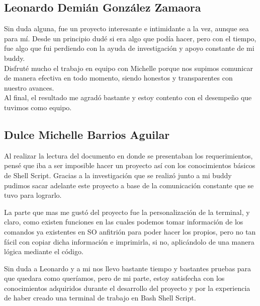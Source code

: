 \documentclass{article}
\begin{document}

\subsection*{Leonardo Demián González Zamaora}

Sin duda alguna, fue un proyecto interesante e intimidante a la vez, aunque sea para mí. Desde un principio dudé si era algo que podía hacer, pero con el tiempo, fue algo que fui perdiendo con la ayuda de investigación y apoyo constante de mi buddy.\\

Disfruté mucho el trabajo en equipo con Michelle porque nos supimos comunicar de manera efectiva en todo momento, siendo honestos y transparentes con nuestro avances.\\

Al final, el resultado me agradó bastante y estoy contento con el desempeño que tuvimos como equipo.\\

\subsection*{Dulce Michelle Barrios Aguilar}

Al realizar la lectura del documento en donde se presentaban los requerimientos, pensé que iba a ser imposible hacer un proyecto así con los conocimientos básicos de Shell Script. Gracias a la investigación que se realizó junto a mi buddy pudimos sacar adelante este proyecto a base de la comunicación constante que se tuvo para lograrlo.

La parte que mas me gustó del proyecto fue la personalización de la terminal, y claro, como existen funciones en las cuales podemos tomar información de los comandos ya existentes en SO anfitrión para poder hacer los propios, pero no tan fácil con copiar dicha información e imprimirla, si no, aplicándolo de una manera lógica mediante el código.

Sin duda a Leonardo y a mi nos llevo bastante tiempo y bastantes pruebas para que quedara como queríamos, pero de mi parte, estoy satisfecha con los conocimientos adquiridos durante el desarrollo del proyecto y por la experiencia de haber creado una terminal de trabajo en Bash Shell Script. 
\end{document}
